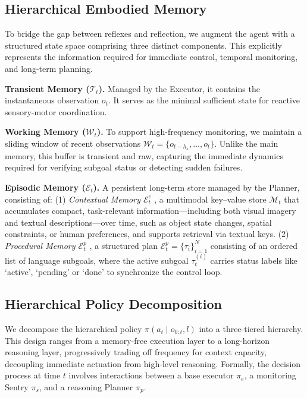 \subsection{Hierarchical Embodied Memory}
To bridge the gap between reflexes and reflection, we augment the agent with a structured state space comprising three distinct components. This explicitly represents the information required for immediate control, temporal monitoring, and long-term planning.

\textbf{Transient Memory ($\mathcal{T}_t$).} Managed by the Executor, it contains the instantaneous observation $o_t$. It serves as the minimal sufficient state for reactive sensory-motor coordination.

\textbf{Working Memory ($\mathcal{W}_t$).} 
To support high-frequency monitoring, we maintain a sliding window of recent observations $\mathcal{W}_t = \{o_{t-h_s}, \dots, o_t\}$. Unlike the main memory, this buffer is transient and raw, capturing the immediate dynamics required for verifying subgoal status or detecting sudden failures.

\textbf{Episodic Memory ($\mathcal{E}_t$).} A persistent long-term store managed by the Planner, consisting of: 
(1) \textit{Contextual Memory $\mathcal{E}_t^{c}$} 
, a multimodal key--value store $\mathcal{M}_t$ that accumulates compact, task-relevant information—including both visual imagery and textual descriptions—over time, such as object state changes, spatial constraints, or human preferences, and supports retrieval via textual keys.
(2) \textit{Procedural Memory $\mathcal{E}_t^{p}$} 
, a structured plan $\mathcal{E}_t^{p} = \{\tau_i\}_{i=1}^{N}$ consisting of an ordered list of language subgoals, where the active subgoal $\tau_t^{(i)}$ carries status labels like `active', `pending' or `done' to synchronize the control loop.


\subsection{Hierarchical Policy Decomposition}
We decompose the hierarchical policy $\pi(a_t \mid o_{0:t}, l)$ into a three-tiered hierarchy. 
This design ranges from a memory-free execution layer to a long-horizon reasoning layer, progressively trading off frequency for context capacity, decoupling immediate actuation from high-level reasoning. Formally, the decision process at time $t$ involves interactions between a base executor $\pi_e$, a monitoring Sentry $\pi_s$, and a reasoning Planner $\pi_p$.

